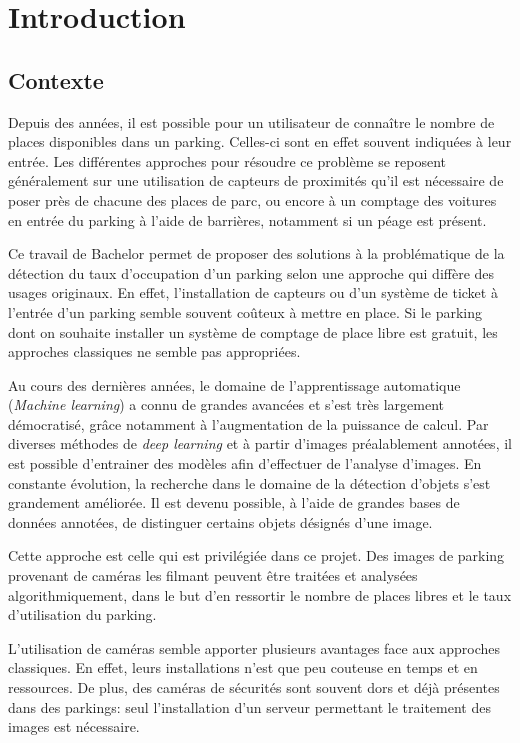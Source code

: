 \chapter{Introduction}

\section{Contexte}
Depuis des années, il est possible pour un utilisateur de connaître le nombre de places disponibles dans un parking. Celles-ci sont en effet souvent indiquées à leur entrée. Les différentes approches pour résoudre ce problème se reposent généralement sur une utilisation de capteurs de proximités qu'il est nécessaire de poser près de chacune des places de parc, ou encore à un comptage des voitures en entrée du parking à l'aide de barrières, notamment si un péage est présent.

Ce travail de Bachelor permet de proposer des solutions à la problématique de la détection du taux d'occupation d'un parking selon une approche qui diffère des usages originaux. En effet, l'installation de capteurs ou d'un système de ticket à l'entrée d'un parking semble souvent coûteux à mettre en place. Si le parking dont on souhaite installer un système de comptage de place libre est gratuit, les approches classiques ne semble pas appropriées.

Au cours des dernières années, le domaine de l'apprentissage automatique (\textit{Machine learning}) a connu de grandes avancées et s'est très largement démocratisé, grâce notamment à l'augmentation de la puissance de calcul. Par diverses méthodes de \textit{deep learning} et à partir d'images préalablement annotées, il est possible d'entrainer des modèles afin d'effectuer de l'analyse d'images. En constante évolution, la recherche dans le domaine de la détection d'objets s'est grandement améliorée. Il est devenu possible, à l'aide de grandes bases de données annotées, de distinguer certains objets désignés d'une image. 

Cette approche est celle qui est privilégiée dans ce projet. Des images de parking provenant de caméras les filmant peuvent être traitées et analysées algorithmiquement, dans le but d'en ressortir le nombre de places libres et le taux d'utilisation du parking. 

L'utilisation de caméras semble apporter plusieurs avantages face aux approches classiques. En effet, leurs installations n'est que peu couteuse en temps et en ressources. De plus, des caméras de sécurités sont souvent dors et déjà présentes dans des parkings: seul l'installation d'un serveur permettant le traitement des images est nécessaire. 

